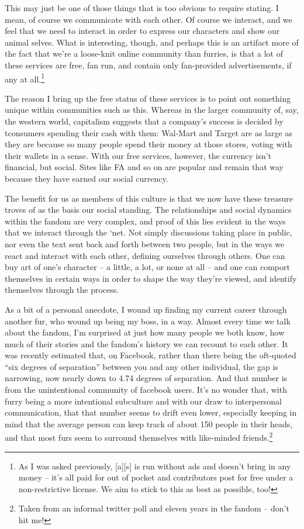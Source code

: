 This may just be one of those things that is too obvious to require stating.  I mean, of course we communicate with each other.  Of course we interact, and we feel that we need to interact in order to express our characters and show our animal selves.  What is interesting, though, and perhaps this is an artifact more of the fact that we're a loose-knit online community than furries, is that a lot of these services are free, fan run, and contain only fan-provided advertisements, if any at all.\footnote{As I was asked previously, [a][s] is run without ads and doesn't bring in any money -- it's all paid for out of pocket and contributors post for free under a non-restrictive license.  We aim to stick to this as best as possible, too!}

The reason I bring up the free status of these services is to point out something unique within communities such as this.  Whereas in the larger community of, say, the western world, capitalism suggests that a company's success is decided by tconsumers spending their cash with them: Wal-Mart and Target are as large as they are because so many people spend their money at those stores, voting with their wallets in a sense.  With our free services, however, the currency isn't financial, but social.  Sites like FA and so on are popular and remain that way because they have earned our social currency.

The benefit for us as members of this culture is that we now have these treasure troves of as the basis our social standing.  The relationships and social dynamics within the fandom are very complex, and proof of this lies evident in the ways that we interact through the `net.  Not simply discussions taking place in public, nor even the text sent back and forth between two people, but in the ways we react and interact with each other, defining ourselves through others.  One can buy art of one's character -- a little, a lot, or none at all -- and one can comport themselves in certain ways in order to shape the way they're viewed, and identify themselves through the process.

As a bit of a personal anecdote, I wound up finding my current career through another fur, who wound up being my boss, in a way.  Almost every time we talk about the fandom, I'm surprised at just how many people we both know, how much of their stories and the fandom's history we can recount to each other.  It was recently estimated that, on Facebook, rather than there being the oft-quoted ``six degrees of separation'' between you and any other individual, the gap is narrowing, now nearly down to 4.74 degrees of separation.  And that number is from the unintentional community of facebook users.  It's no wonder that, with furry being a more intentional subculture and with our draw to interpersonal communication, that that number seems to drift even lower, especially keeping in mind that the average person can keep track of about 150 people in their heads, and that most furs seem to surround themselves with like-minded friends.\footnote{Taken from an informal twitter poll and eleven years in the fandom -- don't hit me!}

